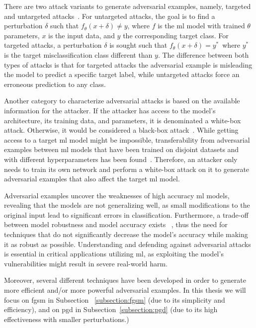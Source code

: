 There are two attack variants to generate adversarial examples, namely,
targeted and untargeted attacks~\cite{huang_adversarial_nodate}. For
untargeted attacks, the goal is to find a perturbation \(\delta\) such
that \(f_{\theta}\left(x + \delta\right) \neq y\), where \(f\) is the
\ac{ml} model with trained \(\theta\) parameters, \(x\) is the input
data, and \(y\) the corresponding target class. For targeted attacks,
a perturbation \(\delta\) is sought such that \(f_{\theta}
\left(x + \delta\right) = y^{\ast}\)\, where \(y^{\ast}\) is the
target misclassification class different than \(y\). The difference
between both types of attacks is that for targeted attacks the
adversarial example is misleading the model to predict a specific
target label, while untargeted attacks force an erroneous prediction
to any class. \

Another category to characterize adversarial attacks is based on the
available information for the attacker. If the attacker has access
to the model's architecture, its training data, and parameters, it
is denominated a white-box attack. Otherwise, it would be considered
a black-box attack~\cite{eykholt_robust_2018}. While getting access to a
target \ac{ml} model might be impossible, transferability from
adversarial examples between \ac{ml} models that have been trained
on disjoint datasets and with different hyperparameters has been
found~\cite{papernot_transferability_2016}. Therefore, an attacker
only needs to train its own network and perform a white-box attack
on it to generate adversarial examples that also affect the target
\ac{ml} model.\

Adversarial examples uncover the weaknesses of high accuracy \ac{ml} models,
revealing that the models are not generalizing well, as small modifications
to the original input lead to significant errors in classification.
Furthermore, a trade-off between model robustness and model accuracy exists
~\cite{tsipras_robustness_2019}, thus the need for techniques that do
not significantly decrease the model's accuracy while making it as
robust as possible. Understanding and defending against adversarial
attacks is essential in critical applications utilizing \ac{ml}, as
exploiting the model's vulnerabilities might result in severe
real-world harm. \

Moreover, several different techniques have been developed in order
to generate more efficient and/or more powerful adversarial examples.
In this thesis we will focus on \ac{fgsm} in Subsection
~\ref{subsection:fgsm} (due to its simplicity and efficiency), and on
\ac{pgd} in Subsection~\ref{subsection:pgd} (due to its high
effectiveness with smaller perturbations.) \

